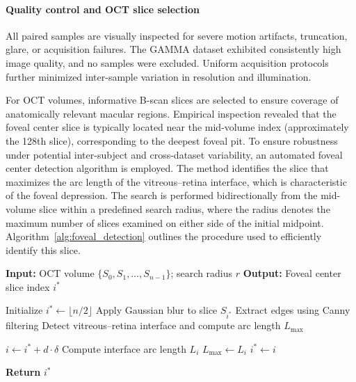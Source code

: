 \documentclass[preprint,12pt]{elsarticle}
\begin{document}
\paragraph{Quality control and OCT slice selection}
All paired samples are visually inspected for severe motion artifacts, truncation, glare, or acquisition failures. The GAMMA dataset exhibited consistently high image quality, and no samples were excluded. Uniform acquisition protocols further minimized inter-sample variation in resolution and illumination.

For OCT volumes, informative B-scan slices are selected to ensure coverage of anatomically relevant macular regions. Empirical inspection revealed that the foveal center slice is typically located near the mid-volume index (approximately the 128th slice), corresponding to the deepest foveal pit. To ensure robustness under potential inter-subject and cross-dataset variability, an automated foveal center detection algorithm is employed. The method identifies the slice that maximizes the arc length of the vitreous–retina interface, which is characteristic of the foveal depression. The search is performed bidirectionally from the mid-volume slice within a predefined search radius, where the radius denotes the maximum number of slices examined on either side of the initial midpoint. Algorithm~\ref{alg:foveal_detection} outlines the procedure used to efficiently identify this slice.

\begin{algorithm}[!t]
    \caption{Foveal Center Slice Detection}
    \label{alg:foveal_detection}
    \begin{algorithmic}[1]

        \STATE \textbf{Input:} OCT volume $\{S_0, S_1, \ldots, S_{n-1}\}$; search radius $r$
        \STATE \textbf{Output:} Foveal center slice index $i^*$

        \STATE Initialize $i^* \leftarrow \lfloor n/2 \rfloor$
        \STATE Apply Gaussian blur to slice $S_{i^*}$
        \STATE Extract edges using Canny filtering
        \STATE Detect vitreous--retina interface and compute arc length $L_{\max}$

        \STATE $i \leftarrow i^* + d \cdot \delta$
        \STATE Compute interface arc length $L_i$
        \STATE $L_{\max} \leftarrow L_i$
        \STATE $i^* \leftarrow i$
        \ENDIF
        \ENDFOR
        \ENDFOR

        \STATE \textbf{Return} $i^*$

    \end{algorithmic}
\end{algorithm}
\end{document}
